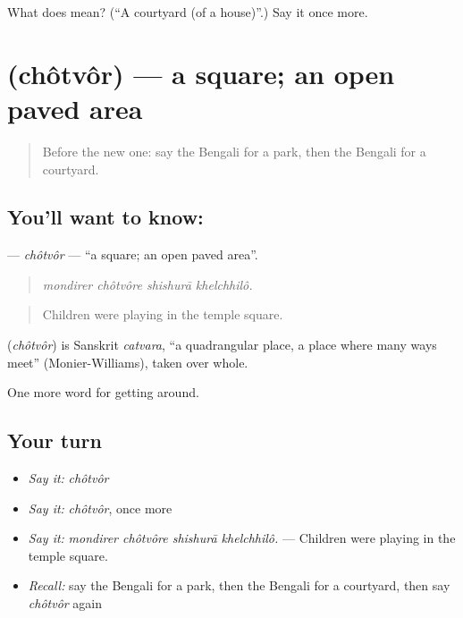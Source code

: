 \begin{tcolorbox}[breakable,colback=teal!4,colframe=teal!35!black,title={Before you move on}]
What does  mean? (\textquotedblleft{}A courtyard (of a house)\textquotedblright{}.) Say it once more.
\end{tcolorbox}
\section[\texorpdfstring{\bn{চত্বর} (chôtvôr)}{চত্বর (chôtvôr)}]{ (chôtvôr) — a square; an open paved area}

\label{lesson:BN-C410-chotvor}



\begin{quote}
Before the new one: say the Bengali for a park, then the Bengali for a courtyard.
\end{quote}

\subsection*{You'll want to know: }
\textbf{} — \emph{chôtvôr} — \textquotedblleft{}a square; an open paved area\textquotedblright{}.

\begin{quote}
   
\end{quote}

\begin{quote}
\emph{mondirer chôtvôre shishurā khelchhilô.}
\end{quote}

\begin{quote}
Children were playing in the temple square.
\end{quote}

\begin{cousinweb}
\textbf{} (\emph{chôtvôr}) is Sanskrit \emph{catvara}, \textquotedblleft{}a quadrangular place, a place where many ways meet\textquotedblright{} (Monier-Williams), taken over whole.
\end{cousinweb}

\begin{grammarlens}[title={What you've built}]
One more word for getting around.
\end{grammarlens}

\subsection*{Your turn}
\begin{itemize}
\raggedright
  \item \emph{Say it:} \emph{chôtvôr}
  \item \emph{Say it:} \emph{chôtvôr}, once more
  \item \emph{Say it:} \emph{mondirer chôtvôre shishurā khelchhilô.} — Children were playing in the temple square.
  \item \emph{Recall:} say the Bengali for a park, then the Bengali for a courtyard, then say \emph{chôtvôr} again
\end{itemize}

